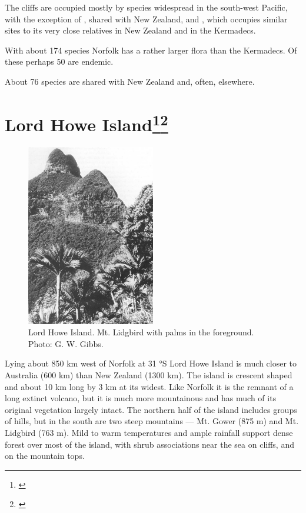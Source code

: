 The cliffs are occupied mostly by species widespread in the south-west Pacific, with the exception of , shared with New Zealand, and , which occupies similar sites to its very close relatives  in New Zealand and  in the Kermadecs.

With about 174 species Norfolk has a rather larger flora than the Kermadecs.
Of these perhaps 50 are endemic.

About 76 species are shared with New Zealand and, often, elsewhere.

\section[Lord Howe Island]{Lord Howe Island\footnote{\cite{oliver1896vegetation}}\footnote{\cite{green1979observations}}}

\begin{figure}
	\includegraphics[width=0.5\textwidth]{graphics/figure120lord-howe-island.jpg}
	\centering
	\caption[Lord Howe Island]{Lord Howe Island.
	Mt. Lidgbird with  palms in the foreground.
	Photo: G. W. Gibbs.}%
	\label{fig:120lord-howe-island}
\end{figure}

Lying about 850 km west of Norfolk at 31 °S Lord Howe Island is much closer to Australia (600 km) than New Zealand (1300 km).
The island is crescent shaped and about 10 km long by 3 km at its widest.
Like Norfolk it is the remnant of a long extinct volcano, but it is much more mountainous and has much of its original vegetation largely intact.
The northern half of the island includes groups of hills, but in the south are two steep mountains --- Mt.
Gower (875 m) and Mt.
Lidgbird (763 m).
Mild to warm temperatures and ample rainfall support dense forest over most of the island, with shrub associations near the sea on cliffs, and on the mountain tops.

